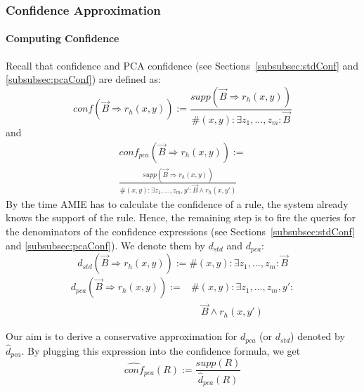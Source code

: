 \subsubsection{Confidence Approximation}\label{sec:conf_appr}


\paragraph{Computing Confidence}
Recall that confidence and PCA confidence (see Sections~\ref{subsubsec:stdConf} and \ref{subsubsec:pcaConf}) are defined as:
\[conf(\vec{B} \Rightarrow r_h(x,y)) := \frac{supp(\vec{B} \Rightarrow r_h(x,y))}{\#(x,y): \exists z_1,...,z_m: \vec{B}}\]
and
\begin{multline*}
conf_{pca}(\vec{B} \Rightarrow r_h(x,y)) :=\\
\frac{supp(\vec{B} \Rightarrow r_h(x,y))}{\#(x,y): \exists z_1,...,z_m,y': \vec{B} \wedge r_h(x,y')}
\end{multline*}
\noindent By the time AMIE has to calculate the confidence of a rule, the system already knows the support of the rule. Hence, the remaining step is to fire the queries for the denominators of the confidence expressions
(see Sections~\ref{subsubsec:stdConf} and \ref{subsubsec:pcaConf}). We denote them by $d_{std}$ and $d_{pca}$:
\begin{equation} \label{eq:denomStandardConf}
 d_{std}(\vec{B} \Rightarrow r_h(x,y)):= \#(x,y): \exists z_1,...,z_m: \vec{B}
\end{equation}
\begin{equation} \label{eq:denomPCA}
\begin{array}{rl}
d_{pca}(\vec{B} \Rightarrow r_h(x,y)) := {}& \#(x,y): \exists z_1,...,z_m,y': \\ &\quad \vec{B} \wedge r_h(x,y')
\end{array}
\end{equation}



\noindent Our aim is to derive a conservative approximation for $d_{pca}$ (or $d_{std}$) denoted by
$\widehat{d}_{pca}$. By plugging this expression into the confidence formula, we get
\begin{equation} \label{eq:pcaApproxConf}
  \widehat{conf}_{pca}(R):=\frac{supp(R)}{\widehat{d}_{pca}(R)}
\end{equation}

